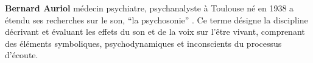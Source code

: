 
    \textbf{Bernard Auriol} médecin psychiatre,
   psychanalyste à Toulouse né en 1938
a étendu ses recherches sur le son, %
\enquote {la psychosonie} \autocite{auriol_stress}. Ce terme
désigne la discipline décrivant et évaluant les effets du
son et de la voix sur l'être vivant, comprenant des éléments
symboliques, psychodynamiques et inconscients du processus
d'écoute. 
